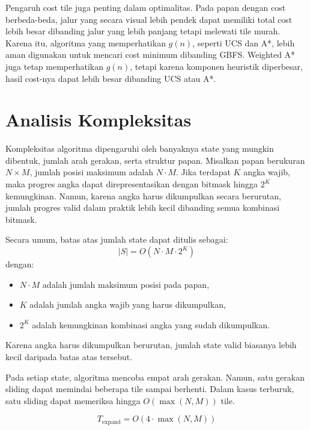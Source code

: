 Pengaruh cost tile juga penting dalam optimalitas. 
Pada papan dengan cost berbeda-beda, jalur yang secara visual lebih pendek dapat memiliki total cost lebih besar dibanding jalur yang lebih panjang tetapi melewati tile murah. 
Karena itu, algoritma yang memperhatikan $g(n)$, seperti UCS dan A*, lebih aman digunakan untuk mencari cost minimum dibanding GBFS. 
Weighted A* juga tetap memperhatikan $g(n)$, tetapi karena komponen heuristik diperbesar, hasil cost-nya dapat lebih besar dibanding UCS atau A*.

\section{Analisis Kompleksitas}

Kompleksitas algoritma dipengaruhi oleh banyaknya state yang mungkin dibentuk, jumlah arah gerakan, serta struktur papan. 
Misalkan papan berukuran $N \times M$, jumlah posisi maksimum adalah $N \cdot M$. 
Jika terdapat $K$ angka wajib, maka progres angka dapat direpresentasikan dengan bitmask hingga $2^K$ kemungkinan. 
Namun, karena angka harus dikumpulkan secara berurutan, jumlah progres valid dalam praktik lebih kecil dibanding semua kombinasi bitmask.

\begin{tcolorbox}[
	colback=purple!5,
	colframe=purple!60!black,
	title=\textbf{Perkiraan Jumlah State},
	arc=2mm,
	boxrule=0.8pt
]
Secara umum, batas atas jumlah state dapat ditulis sebagai:
\[
	|S| = O(N \cdot M \cdot 2^K)
\]
dengan:
\begin{itemize}
	\item $N \cdot M$ adalah jumlah maksimum posisi pada papan,
	\item $K$ adalah jumlah angka wajib yang harus dikumpulkan,
	\item $2^K$ adalah kemungkinan kombinasi angka yang sudah dikumpulkan.
\end{itemize}
Karena angka harus dikumpulkan berurutan, jumlah state valid biasanya lebih kecil daripada batas atas tersebut.
\end{tcolorbox}

Pada setiap state, algoritma mencoba empat arah gerakan. 
Namun, satu gerakan sliding dapat memindai beberapa tile sampai berhenti. 
Dalam kasus terburuk, satu sliding dapat memeriksa hingga $O(\max(N,M))$ tile.

\[
	T_{\text{expand}} = O(4 \cdot \max(N,M))
\]

